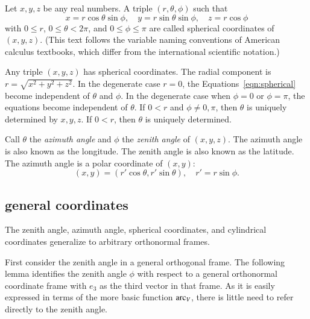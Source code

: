 \begin{definition}
Let $x,y,z$ be any real numbers.  A
triple $(r,\theta,\phi)$ such that
    \begin{equation}
    \label{eqn:spherical}
    x = r\cos\theta\sin\phi,\quad y = r\sin\theta\sin\phi,\quad
    z = r\cos\phi
    \end{equation}
with $0\le r$, $0\le\theta<2\pi$, and $0\le\phi\le\pi$ are called
spherical coordinates of $(x,y,z)$.  (This text follows the variable
naming conventions of American calculus textbooks, which differ
from the international scientific notation.)
\end{definition}

Any triple $(x,y,z)$ has spherical coordinates.
The radial component is $r = \sqrt{x^2+y^2+z^2}$.  In the degenerate case $r=0$,
the Equations~\ref{eqn:spherical} become independent of $\theta$
and $\phi$. In the degenerate case when $\phi = 0$ or $\phi =
\pi$, the equations become independent of $\theta$. If $0<r$ and $\phi\ne 0,\pi$,  then $\theta$ is uniquely
determined by $x,y,z$. If $0<r$, then $\theta$ is uniquely determined.


Call $\theta$ the {\it azimuth angle\/} and $\phi$ the {\it
zenith angle\/} of $(x,y,z)$.  The azimuth angle is also known as
the longitude.  The zenith angle is also known as the latitude. The
azimuth angle is a polar coordinate of $(x,y)$:
    $$
    (x,y) = (r'\cos\theta,r'\sin\theta), \quad r' = r\sin\phi.
    $$


\subsection{general coordinates}

The zenith angle, azimuth angle,
spherical coordinates, and cylindrical coordinates 
generalize to arbitrary orthonormal frames.

First consider the zenith angle in a general orthogonal frame.
The following lemma identifies the zenith angle $\phi$ with respect to
a general orthonormal coordinate frame with $e_3$ as the third
vector in that frame.  As it is easily expressed in terms
of the more basic function $\operatorname{arc}_V$, 
there is little need to refer directly to the zenith angle.

